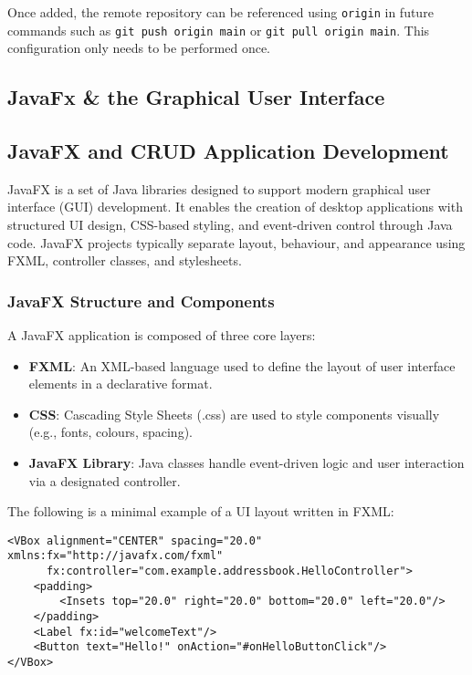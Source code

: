 \documentclass{article}
\newcommand{\codecmd}[1]{\textcolor[rgb]{0,0.5,0}{\texttt{#1}}}
\begin{document}
\noindent Once added, the remote repository can be referenced using \codecmd{origin} in future commands such as \codecmd{git push origin main} or \codecmd{git pull origin main}. This configuration only needs to be performed once.

\subsection{JavaFx \& the Graphical User Interface }

\subsection{JavaFX and CRUD Application Development}

JavaFX is a set of Java libraries designed to support modern graphical user interface (GUI) development. It enables the creation of desktop applications with structured UI design, CSS-based styling, and event-driven control through Java code. JavaFX projects typically separate layout, behaviour, and appearance using FXML, controller classes, and stylesheets.

\subsubsection{JavaFX Structure and Components}

A JavaFX application is composed of three core layers:

\begin{itemize}
    \item \textbf{FXML}: An XML-based language used to define the layout of user interface elements in a declarative format.
    \item \textbf{CSS}: Cascading Style Sheets (.css) are used to style components visually (e.g., fonts, colours, spacing).
    \item \textbf{JavaFX Library}: Java classes handle event-driven logic and user interaction via a designated controller.
\end{itemize}

The following is a minimal example of a UI layout written in FXML:

\begin{verbatim}
<VBox alignment="CENTER" spacing="20.0" xmlns:fx="http://javafx.com/fxml"
      fx:controller="com.example.addressbook.HelloController">
    <padding>
        <Insets top="20.0" right="20.0" bottom="20.0" left="20.0"/>
    </padding>
    <Label fx:id="welcomeText"/>
    <Button text="Hello!" onAction="#onHelloButtonClick"/>
</VBox>
\end{verbatim}
\end{document}

